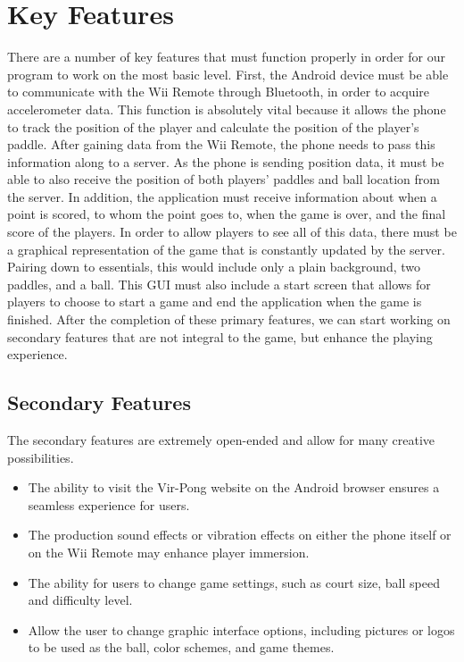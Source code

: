 \documentclass[12pt]{article}
\begin{document}
\section{Key Features}
There are a number of key features that must function properly in order for our program
to work on the most basic level. First, the Android device must be able to communicate with the
Wii Remote through Bluetooth, in order to acquire accelerometer data. This function is absolutely vital
because it allows the phone to track the position of the player and calculate the position of the
player's paddle. After gaining data from the Wii Remote, the phone needs to pass this information
along to a server. As the phone is sending position data, it must be able to also receive the
position of both players' paddles and ball location from the server. In addition, the application 
must receive information about when a point is scored, to whom the point goes to, when the game is over, and
the final score of the players. In order to allow players to see all of this data, there must be a
graphical representation of the game that is constantly updated by the server. Pairing down to
essentials, this would include only a plain background, two paddles, and a ball. This GUI must
also include a start screen that allows for players to choose to start a game and end the
application when the game is finished.  After the completion of these primary features, we can start working on secondary features that are not integral to the game, but enhance the playing experience. 

\subsection{Secondary Features}
The secondary features are extremely open-ended and allow for many creative possibilities.
\begin{itemize}
\item The ability to visit the Vir-Pong website on the Android browser ensures a seamless experience for users. 
\item The production sound effects or vibration effects on either the phone itself or on the Wii Remote may enhance player immersion.
\item The ability for users to change game settings, such as court size, ball speed and difficulty level. 
\item Allow the user to change graphic interface options, including pictures or logos to be used as the ball, color schemes, and game themes. 
\end{itemize}
\end{document}
